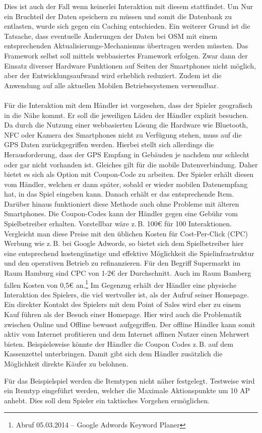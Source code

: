 Dies ist auch der Fall wenn keinerlei Interaktion mit diesem stattfindet. Um Nur ein Bruchteil der Daten speichern zu müssen und somit die Datenbank zu entlasten, wurde sich gegen ein Caching entschieden. Ein weiterer Grund ist die Tatsache, dass eventuelle Änderungen der Daten bei OSM mit einem entsprechenden Aktualisierungs-Mechanismus übertragen werden müssten.
Das Framework selbst soll mittels webbasiertes Framework erfolgen.
Zwar dann der Einsatz diverser Hardware Funktionen auf Seiten der Smartphones nicht möglich, aber der Entwicklungsaufwand wird erheblich reduziert. Zudem ist die Anwendung auf alle aktuellen Mobilen Betriebssystemen verwendbar.
\\\\
Für die Interaktion mit dem Händler ist vorgesehen, dass der Spieler geografisch in die Nähe kommt. Er soll die jeweiligen Läden der Händler explizit besuchen. Da durch die Nutzung einer webbasierten Lösung die Hardware wie Bluetooth, NFC oder Kamera des Smartphones nicht zu Verfügung stehen, muss auf die GPS Daten zurückgegriffen werden.
Hierbei stellt sich allerdings die Herausforderung, dass der GPS Empfang in Gebäuden je nachdem nur schlecht oder gar nicht vorhanden ist. Gleiches gilt für die mobile Datenverbindung. Daher bietet es sich als Option mit Coupon-Code zu arbeiten. Der Spieler erhält diesen vom Händler, welchen er dann später, sobald er wieder mobilen Datenempfang hat, in das Spiel eingeben kann. Danach erhält er das entsprechende Item. Darüber hinaus funktioniert diese Methode auch ohne Probleme mit älteren Smartphones. Die Coupon-Codes kann der Händler gegen eine Gebühr vom Spielbetreiber erhalten. Vorstellbar wäre z.\,B. 100€ für 100 Interaktionen. Vergleicht man diese Preise mit den üblichen Kosten für Cost-Per-Click (CPC) Werbung wie z.\,B. bei Google Adwords, so bietet sich dem Spielbetreiber hier eine entsprechend kostengünstige und effektive Möglichkeit die Spielinfrastruktur und den operativen Betrieb zu refinanzieren.\cite{Guerini.2010} Für den Begriff Supermarkt im Raum Hamburg sind CPC von 1-2€ der Durchschnitt. Auch im Raum Bamberg fallen Kosten von 0,5€ an.\footnote{Abruf 05.03.2014 -- Google Adwords Keyword Planer} Im Gegenzug erhält der Händler eine physische Interaktion des Spielers, die viel wertvoller ist, als der Aufruf seiner Homepage. Ein direkter Kontakt des Spielers mit dem Point of Sales wird eher zu einem Kauf führen als der Besuch einer Homepage. Hier wird auch die Problematik zwischen Online und Offline bewusst aufgegriffen. Der offline Händler kann somit aktiv vom Internet profitieren und dem Internet affinen Nutzer einen Mehrwert bieten. Beispielsweise könnte  der Händler die Coupon Codes z.\,B. auf dem Kassenzettel unterbringen. Damit gibt sich dem Händler zusätzlich die Möglichkeit direkte Käufer zu belohnen.

Für das Beispielspiel werden die Itemtypen nicht näher festgelegt. Testweise wird ein Itemtyp eingeführt werden, welcher die Maximale Aktionspunkte um 10 AP anhebt. Dies soll dem Spieler ein taktisches Vorgehen ermöglichen.
